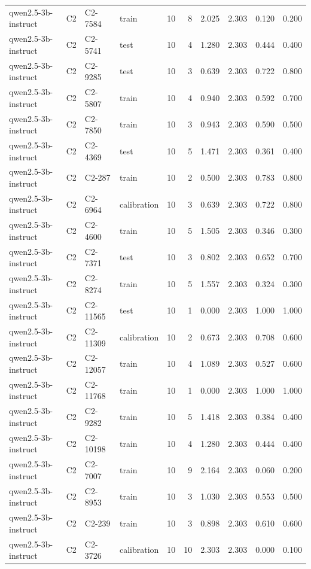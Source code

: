 \begin{table}
\begin{tabular}{llllrrrrrr}
qwen2.5-3b-instruct & C2 & C2-7584 & train & 10 & 8 & 2.025 & 2.303 & 0.120 & 0.200 \\
qwen2.5-3b-instruct & C2 & C2-5741 & test & 10 & 4 & 1.280 & 2.303 & 0.444 & 0.400 \\
qwen2.5-3b-instruct & C2 & C2-9285 & test & 10 & 3 & 0.639 & 2.303 & 0.722 & 0.800 \\
qwen2.5-3b-instruct & C2 & C2-5807 & train & 10 & 4 & 0.940 & 2.303 & 0.592 & 0.700 \\
qwen2.5-3b-instruct & C2 & C2-7850 & train & 10 & 3 & 0.943 & 2.303 & 0.590 & 0.500 \\
qwen2.5-3b-instruct & C2 & C2-4369 & test & 10 & 5 & 1.471 & 2.303 & 0.361 & 0.400 \\
qwen2.5-3b-instruct & C2 & C2-287 & train & 10 & 2 & 0.500 & 2.303 & 0.783 & 0.800 \\
qwen2.5-3b-instruct & C2 & C2-6964 & calibration & 10 & 3 & 0.639 & 2.303 & 0.722 & 0.800 \\
qwen2.5-3b-instruct & C2 & C2-4600 & train & 10 & 5 & 1.505 & 2.303 & 0.346 & 0.300 \\
qwen2.5-3b-instruct & C2 & C2-7371 & test & 10 & 3 & 0.802 & 2.303 & 0.652 & 0.700 \\
qwen2.5-3b-instruct & C2 & C2-8274 & train & 10 & 5 & 1.557 & 2.303 & 0.324 & 0.300 \\
qwen2.5-3b-instruct & C2 & C2-11565 & test & 10 & 1 & 0.000 & 2.303 & 1.000 & 1.000 \\
qwen2.5-3b-instruct & C2 & C2-11309 & calibration & 10 & 2 & 0.673 & 2.303 & 0.708 & 0.600 \\
qwen2.5-3b-instruct & C2 & C2-12057 & train & 10 & 4 & 1.089 & 2.303 & 0.527 & 0.600 \\
qwen2.5-3b-instruct & C2 & C2-11768 & train & 10 & 1 & 0.000 & 2.303 & 1.000 & 1.000 \\
qwen2.5-3b-instruct & C2 & C2-9282 & train & 10 & 5 & 1.418 & 2.303 & 0.384 & 0.400 \\
qwen2.5-3b-instruct & C2 & C2-10198 & train & 10 & 4 & 1.280 & 2.303 & 0.444 & 0.400 \\
qwen2.5-3b-instruct & C2 & C2-7007 & train & 10 & 9 & 2.164 & 2.303 & 0.060 & 0.200 \\
qwen2.5-3b-instruct & C2 & C2-8953 & train & 10 & 3 & 1.030 & 2.303 & 0.553 & 0.500 \\
qwen2.5-3b-instruct & C2 & C2-239 & train & 10 & 3 & 0.898 & 2.303 & 0.610 & 0.600 \\
qwen2.5-3b-instruct & C2 & C2-3726 & calibration & 10 & 10 & 2.303 & 2.303 & 0.000 & 0.100 \\

\end{tabular}
\end{table}
